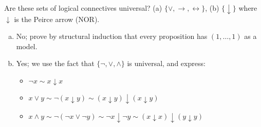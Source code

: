 \begin{problem} 
    
    Are these sets of logical connectives universal? (a) $\{\vee, \rightarrow, \leftrightarrow\}$, (b) $\{\downarrow\}$ where $\downarrow$ is the Peirce arrow (NOR).    

    \begin{solution}
        \begin{enumerate}[(a)]
            \item No; prove by structural induction that every proposition has $(1,\dots,1)$ as a model. 
            \item Yes; we use the fact that $\{\neg,\lor,\land\}$ is universal, and express:
            \begin{itemize}
                \item $\neg x\sim x\downarrow x$
                \item $x\lor y\sim\neg(x\downarrow y)\sim (x\downarrow y)\downarrow(x\downarrow y)$
                \item $x\land y\sim \neg(\neg x\lor \neg y)\sim \neg x\downarrow\neg y\sim (x\downarrow x)\downarrow(y\downarrow y)$
            \end{itemize}
        \end{enumerate}            
    \end{solution}

\end{problem}


